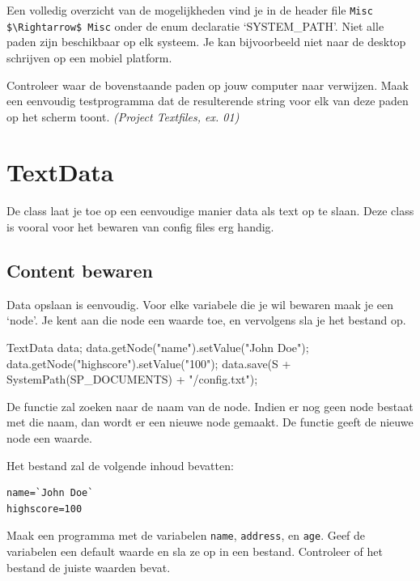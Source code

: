 Een volledig overzicht van de mogelijkheden vind je in de header file \verb|Misc $\Rightarrow$ Misc| onder de enum declaratie `SYSTEM\_PATH'. Niet alle paden zijn beschikbaar op elk systeem. Je kan bijvoorbeeld niet naar de desktop schrijven op een mobiel platform.

\begin{exercise}
Controleer waar de bovenstaande paden op jouw computer naar verwijzen. Maak een eenvoudig testprogramma dat de resulterende string voor elk van deze paden op het scherm toont. \textsl{(Project Textfiles, ex. 01)}
\end{exercise}

\section{TextData}

De class  laat je toe op een eenvoudige manier data als text op te slaan. Deze class is vooral voor het bewaren van config files erg handig.

\subsection{Content bewaren}
Data opslaan is eenvoudig. Voor elke variabele die je wil bewaren maak je een `node'. Je kent aan die node een waarde toe, en vervolgens sla je het bestand op.

\begin{code}
TextData data;
data.getNode("name").setValue("John Doe");
data.getNode("highscore").setValue("100");
data.save(S + SystemPath(SP_DOCUMENTS) + "/config.txt");
\end{code} 

De functie  zal zoeken naar de naam van de node. Indien er nog geen node bestaat met die naam, dan wordt er een nieuwe node gemaakt. De functie  geeft de nieuwe node een waarde.

Het bestand zal de volgende inhoud bevatten:
\begin{verbatim}
name=`John Doe`
highscore=100
\end{verbatim}

\begin{exercise}
Maak een programma met de variabelen \texttt{name}, \texttt{address}, en \texttt{age}. Geef de variabelen een default waarde en sla ze op in een bestand. Controleer of het bestand de juiste waarden bevat.
\end{exercise}

